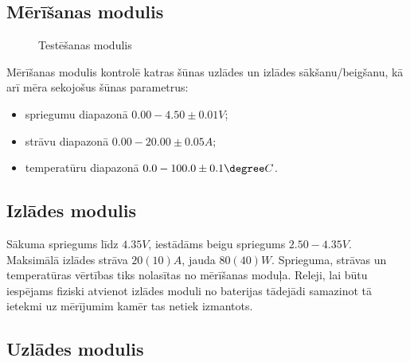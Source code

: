 \documentclass[12pt,fleqn,titlepage,oneside]{article}
\numberwithin{equation}{section}
\numberwithin{figure}{section}
\numberwithin{table}{section}
\begin{document}
\subsection{Mērīšanas modulis}

\begin{figure}[h]
	\centering
	\caption{Testēšanas modulis}
\end{figure}

Mērīšanas modulis kontrolē katras šūnas uzlādes un izlādes sākšanu/beigšanu, kā arī mēra sekojošus šūnas parametrus:
\begin{itemize}
	\item spriegumu diapazonā $0.00-4.50\pm0.01 V$;
	\item strāvu diapazonā $0.00-20.00\pm0.05 A$;
	\item temperatūru diapazonā $0.0-100.0\pm0.1\degree C$.
\end{itemize}

\subsection{Izlādes modulis}

Sākuma spriegums līdz $4.35V$, iestādāms beigu spriegums $2.50-4.35 V$.
Maksimālā izlādes strāva $20(10) A$, jauda $80(40) W$.
Sprieguma, strāvas un temperatūras vērtības tiks nolasītas no mērīšanas moduļa. 
Releji, lai būtu iespējams fiziski atvienot izlādes moduli no baterijas tādejādi samazinot tā ietekmi uz mērījumim kamēr tas netiek izmantots.

\subsection{Uzlādes modulis}
\end{document}
